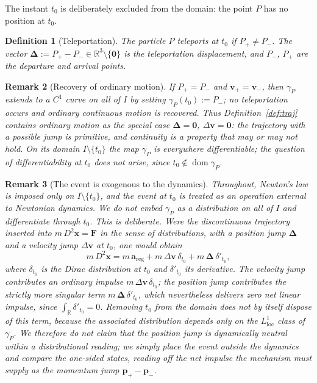 \documentclass[10pt,a4paper]{amsart}
\newtheorem{definition}{Definition}[section]
\newtheorem{remark}[definition]{Remark}
\begin{document}
	The instant $t_0$ is deliberately excluded from the domain: the point
	$P$ has no position at $t_0$.
	
	\begin{definition}[Teleportation]
		\label{def:teleport}
		The particle $P$ \emph{teleports} at $t_0$ if $P_{+}\neq P_{-}$. The
		vector $\boldsymbol\Delta:=P_{+}-P_{-}\in\mathbb R^3\setminus
		\{\mathbf 0\}$ is the \emph{teleportation displacement}, and
		$P_{-}$, $P_{+}$ are the \emph{departure} and \emph{arrival}
		points.
	\end{definition}
	
	\begin{remark}[Recovery of ordinary motion]
		If $P_{+}=P_{-}$ and $\mathbf v_{+}=\mathbf v_{-}$, then $\gamma_P$
		extends to a $C^{1}$ curve on all of $I$ by setting
		$\gamma_P(t_0):=P_{-}$; no teleportation occurs and ordinary
		continuous motion is recovered. Thus Definition~\ref{def:traj}
		contains ordinary motion as the special case
		$\boldsymbol\Delta=\mathbf 0$, $\Delta\mathbf v=\mathbf 0$: the
		trajectory with a possible jump is primitive, and continuity is a
		property that may or may not hold. On its domain $I\setminus\{t_0\}$
		the map $\gamma_P$ is everywhere differentiable; the question of
		differentiability \emph{at} $t_0$ does not arise, since
		$t_0\notin\operatorname{dom}\gamma_P$.
	\end{remark}
	
	\begin{remark}[The event is exogenous to the dynamics]
		\label{rem:exogenous}
		Throughout, Newton's law is imposed only on $I\setminus\{t_0\}$,
		and the event at $t_0$ is treated as an operation external to
		Newtonian dynamics. We do \emph{not} embed $\gamma_P$ as a
		distribution on all of $I$ and differentiate through $t_0$. This is
		deliberate. Were the discontinuous trajectory inserted into
		$m\,D^{2}\mathbf x=\mathbf F$ in the sense of distributions, with a
		position jump $\boldsymbol\Delta$ and a velocity jump
		$\Delta\mathbf v$ at $t_0$, one would obtain
		\[
		m\,D^{2}\mathbf x
		=m\,\mathbf a_{\mathrm{reg}}
		+m\,\Delta\mathbf v\,\delta_{t_0}
		+m\,\boldsymbol\Delta\,\delta'_{t_0},
		\]
		where $\delta_{t_0}$ is the Dirac distribution at $t_0$ and
		$\delta'_{t_0}$ its derivative. The velocity jump contributes an
		ordinary impulse $m\,\Delta\mathbf v\,\delta_{t_0}$; the position
		jump contributes the strictly more singular term
		$m\,\boldsymbol\Delta\,\delta'_{t_0}$, which nevertheless delivers
		\emph{zero} net linear impulse, since $\int_{\mathbb R}\delta'_{t_0}
		=0$. Removing $t_0$ from the domain does not by itself dispose of
		this term, because the associated distribution depends only on the
		$L^{1}_{\mathrm{loc}}$ class of $\gamma_P$. We therefore do not
		claim that the position jump is dynamically neutral within a
		distributional reading; we simply place the event outside the
		dynamics and compare the one-sided states, reading off the net
		impulse the mechanism must supply as the momentum jump
		$\mathbf p_{+}-\mathbf p_{-}$.
	\end{remark}
	
\end{document}
